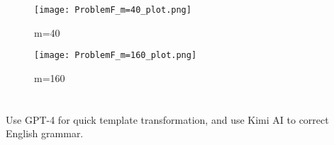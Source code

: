 \documentclass[a4paper]{article}
\begin{document}
    \begin{figure}[H]
        \centering
        \texttt{[image: ProblemF\_m=40\_plot.png]}
        \caption{m=40}
    \end{figure}

    \begin{figure}[H]
        \centering
        \texttt{[image: ProblemF\_m=160\_plot.png]}
        \caption{m=160}
    \end{figure}
    
    \section*{  }
    Use GPT-4 for quick template transformation, and use Kimi AI to correct English grammar.
    
    
\end{document}
